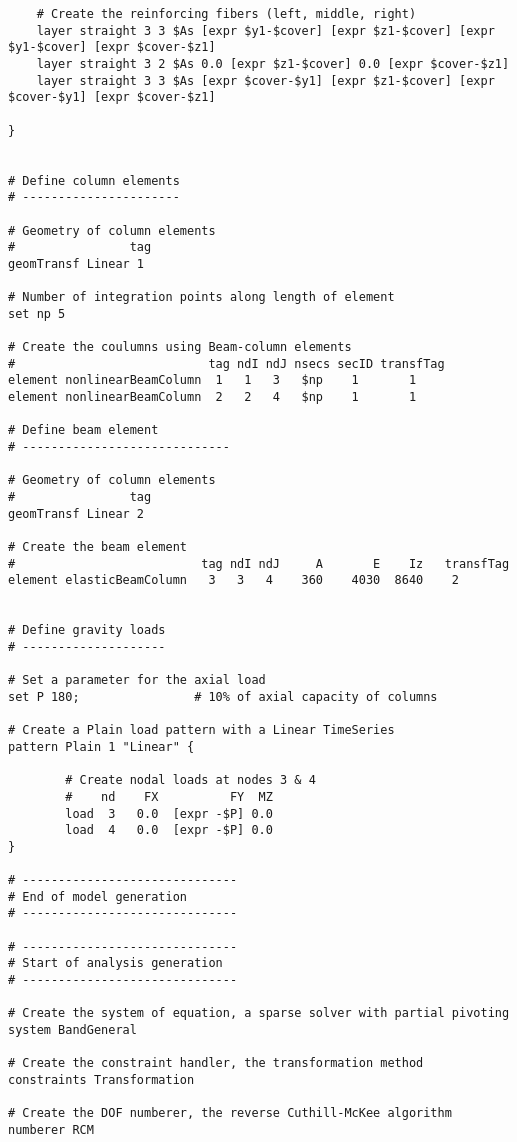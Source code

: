 \documentclass[12pt]{article}
\begin{document}
{\begin{verbatim}
    # Create the reinforcing fibers (left, middle, right)
    layer straight 3 3 $As [expr $y1-$cover] [expr $z1-$cover] [expr $y1-$cover] [expr $cover-$z1]
    layer straight 3 2 $As 0.0 [expr $z1-$cover] 0.0 [expr $cover-$z1]
    layer straight 3 3 $As [expr $cover-$y1] [expr $z1-$cover] [expr $cover-$y1] [expr $cover-$z1]

}    


# Define column elements
# ----------------------

# Geometry of column elements
#                tag 
geomTransf Linear 1  

# Number of integration points along length of element
set np 5

# Create the coulumns using Beam-column elements
#                           tag ndI ndJ nsecs secID transfTag
element nonlinearBeamColumn  1   1   3   $np    1       1 
element nonlinearBeamColumn  2   2   4   $np    1       1 

# Define beam element
# -----------------------------

# Geometry of column elements
#                tag 
geomTransf Linear 2  

# Create the beam element
#                          tag ndI ndJ     A       E    Iz   transfTag
element elasticBeamColumn   3   3   4    360    4030  8640    2


# Define gravity loads
# --------------------

# Set a parameter for the axial load
set P 180;                # 10% of axial capacity of columns

# Create a Plain load pattern with a Linear TimeSeries
pattern Plain 1 "Linear" {

        # Create nodal loads at nodes 3 & 4
        #    nd    FX          FY  MZ 
        load  3   0.0  [expr -$P] 0.0
        load  4   0.0  [expr -$P] 0.0
}

# ------------------------------
# End of model generation
# ------------------------------

# ------------------------------
# Start of analysis generation
# ------------------------------

# Create the system of equation, a sparse solver with partial pivoting
system BandGeneral

# Create the constraint handler, the transformation method
constraints Transformation

# Create the DOF numberer, the reverse Cuthill-McKee algorithm
numberer RCM


\end{verbatim}}
\end{document}
